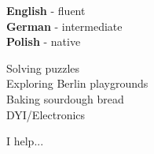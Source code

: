 \documentclass[8pt]{developercv} %
\begin{document}

\begin{minipage}[t]{0.3\textwidth}
	\vspace{-\baselineskip} %

	
	\textbf{English} - fluent\\
	\textbf{German} - intermediate\\
	\textbf{Polish} - native
\end{minipage}
\hfill
\begin{minipage}[t]{0.3\textwidth}
	\vspace{-\baselineskip} %
	
	
	Solving puzzles\\
	Exploring Berlin playgrounds\\
	Baking sourdough bread\\
	DYI/Electronics
\end{minipage}
\hfill
\begin{minipage}[t]{0.3\textwidth}
	\vspace{-\baselineskip} %
	
	
	I help... \lorem
\end{minipage}

\end{document}

